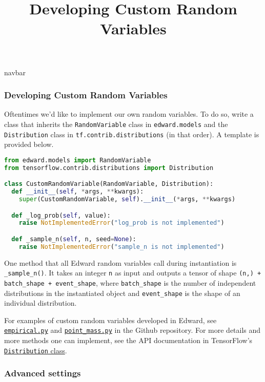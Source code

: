 \title{Developing Custom Random Variables}

{{navbar}}

\subsubsection{Developing Custom Random Variables}

Oftentimes we'd like to implement our own random variables.
To do so, write a class that inherits
the \texttt{RandomVariable} class in \texttt{edward.models} and
the \texttt{Distribution} class in \texttt{tf.contrib.distributions} (in that
order). A template is provided below.

\begin{lstlisting}[language=Python]
from edward.models import RandomVariable
from tensorflow.contrib.distributions import Distribution

class CustomRandomVariable(RandomVariable, Distribution):
  def __init__(self, *args, **kwargs):
    super(CustomRandomVariable, self).__init__(*args, **kwargs)

  def _log_prob(self, value):
    raise NotImplementedError("log_prob is not implemented")

  def _sample_n(self, n, seed=None):
    raise NotImplementedError("sample_n is not implemented")
\end{lstlisting}

One method that all Edward random variables call during instantiation is
\texttt{_sample_n()}.
It takes an integer \texttt{n} as input and outputs a tensor of shape
\texttt{(n,) + batch_shape + event_shape}, where \texttt{batch_shape}
is the number of independent distributions in the instantiated object
and \texttt{event_shape} is the shape of an individual distribution.

For examples of custom random variables developed in Edward, see
\href{https://github.com/blei-lab/edward/blob/master/edward/models/empirical.py}{\texttt{empirical.py}}
and
\href{https://github.com/blei-lab/edward/blob/master/edward/models/point_mass.py}{\texttt{point_mass.py}}
in the Github repository.
For more details and more methods one can implement, see the API
documentation in TensorFlow's
\href{https://www.tensorflow.org/api_docs/python/tf/contrib/distributions/Distribution}{\texttt{Distribution} class}.

\subsubsection{Advanced settings}

